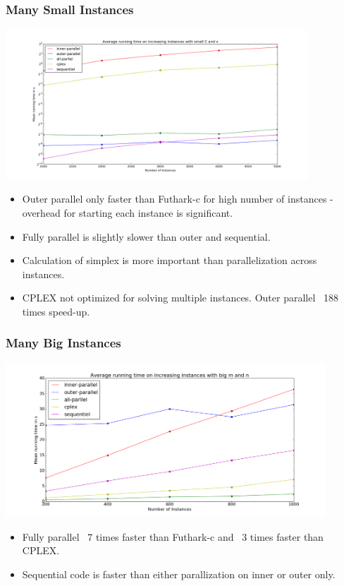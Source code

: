 \documentclass{beamer}
\begin{document}
\begin{frame}[fragile]
\frametitle{Many Small Instances}
\centering
\includegraphics[width=0.85\textwidth]{../Doc/figures/many-small}
\begin{itemize}
	\item Outer parallel only faster than Futhark-c for high number of instances - overhead for starting each instance is significant.
	\item Fully parallel is slightly slower than outer and sequential. 
	\item Calculation of simplex is more important than parallelization across instances.
	\item CPLEX not optimized for solving multiple instances. Outer parallel ~188 times speed-up.
\end{itemize}
\end{frame}

\begin{frame}[fragile]
\frametitle{Many Big Instances}
\centering
\includegraphics[width=0.9\textwidth]{../Doc/figures/many-big}
\begin{itemize}
	\item Fully parallel ~7 times faster than Futhark-c and ~3 times faster than CPLEX.
	\item Sequential code is faster than either parallization on inner or outer only.
\end{itemize}
\end{frame}
\end{document}

